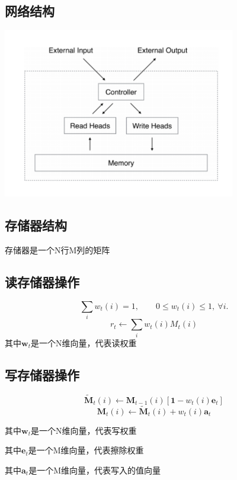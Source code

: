\documentclass{article} %
\begin{document}
\begin{CJK*}{UTF8}{gkai}
\subsection{网络结构}
\begin{center}
\includegraphics[width=4in]{neural-turing-machines.png}
\end{center}

\subsection{存储器结构}
存储器是一个N行M列的矩阵

\subsection{读存储器操作}
$$ \sum _{i} w _{t}\left( i \right) = 1,\qquad 0 \leq w _{t}\left( i \right) \leq 1,\ \forall i.$$
$$ r _{t} \leftarrow \sum _{i} w _{t}\left( i \right) M _{t}\left( i \right)$$
其中$ \textbf{w} _{t} $是一个N维向量，代表读权重

\subsection{写存储器操作}
$$ \tilde{\textbf{M}} _{t} \left( i \right) \leftarrow \textbf{M} _{t-1} \left( i \right) \left [\textbf{1}- w _{t}\left( i \right)\textbf{e} _{t} \right ] $$
$$ \textbf{M} _{t} \left( i \right) \leftarrow \tilde{\textbf{M}} _{t} \left( i \right) + w _{t}\left( i \right)\textbf{a} _{t} $$

其中$ \textbf{w} _{t} $是一个N维向量，代表写权重

其中$ \textbf{e} _{t} $是一个M维向量，代表擦除权重

其中$ \textbf{a} _{t} $是一个M维向量，代表写入的值向量


\end{CJK*}
\end{document}
